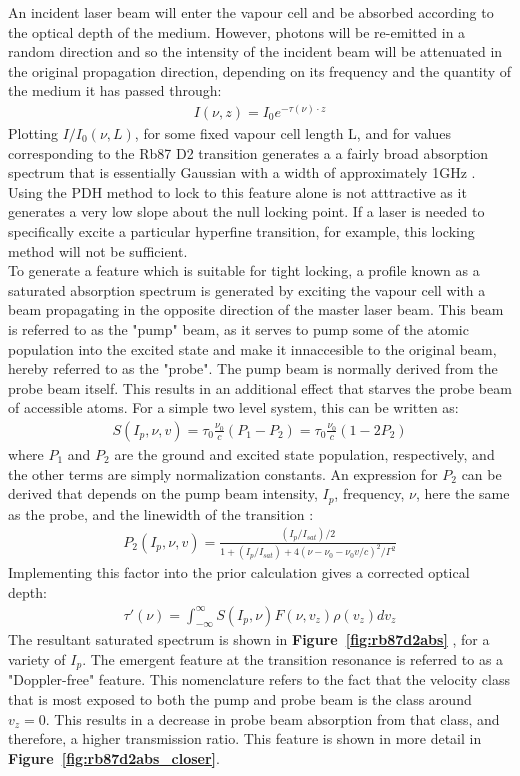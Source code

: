 An incident laser beam will enter the vapour cell and be absorbed according to
the optical depth of the medium. However, photons will be re-emitted in a random
direction and so the intensity of the incident beam will be attenuated in the
original propagation direction, depending on its frequency and the quantity
of the medium it has passed through:
\begin{gather}
  I(\nu, z) = I_0 e^{-\tau(\nu)\cdot z}
\end{gather}
Plotting $I/I_0 (\nu, L)$, for some fixed vapour cell length L, and for
values corresponding to the Rb87 D2 transition generates a
a fairly broad absorption spectrum that is essentially Gaussian with a width of approximately 1GHz \cite{maguire2006}.  Using the PDH method to lock to this feature
alone is not atttractive as it generates a very low slope about the null locking
point. If a laser is needed to specifically excite a particular hyperfine
transition, for example, this locking method will not be sufficient. \\

To generate a feature which is suitable for tight locking, a profile known as a
saturated absorption spectrum is generated by exciting the vapour cell with
a beam propagating in the opposite direction of the master laser beam. This beam
is referred to as the "pump" beam, as it serves to pump some of the atomic
population into the excited state and make it innaccesible to the original beam,
hereby referred to as the "probe". The pump beam is normally derived from the
probe beam itself. This results in an additional effect that starves the probe
beam of accessible atoms. For a simple two level system, this can be written as:
\begin{gather}
  S(I_p, \nu, v) = \tau_0 \frac{\nu_0}{c} (P_1 - P_2) =
    \tau_0 \frac{\nu_0}{c} (1 - 2 P_2)
\end{gather}
where $P_1$ and $P_2$ are the ground and excited state population, respectively,
and the other terms are simply normalization constants. An expression for
$P_2$ can be derived that depends on the pump beam intensity, $I_p$, frequency,
$\nu$, here the same as the probe, and the linewidth of the transition
\cite{maguire2006}:
\begin{gather}
  P_2(I_p, \nu, v) = \frac{ (I_p/I_{sat})/2}{1 + (I_p/I_{sat}) +
    4(\nu - \nu_0 - \nu_0 v/c)^2/\Gamma^2}
\end{gather}
Implementing this factor into the prior calculation gives a corrected optical
depth:
\begin{gather}\label{eq:corr_opt_depth}
  \tau'(\nu) = \int_{-\infty}^\infty S(I_p, \nu) F(\nu, v_z) \rho(v_z) dv_z
\end{gather}
The resultant saturated spectrum is shown in \textbf{Figure~\ref{fig:rb87d2abs}}
, for a variety of $I_p$. The emergent feature at the transition resonance is
referred to as a "Doppler-free" feature. This nomenclature refers to the fact
that the velocity class that is most exposed to both the pump and probe beam
is the class around $v_z = 0$. This results in a decrease in probe beam
absorption from that class, and therefore, a higher transmission ratio.
This feature is shown in more detail in \textbf{Figure~\ref{fig:rb87d2abs_closer}}.

